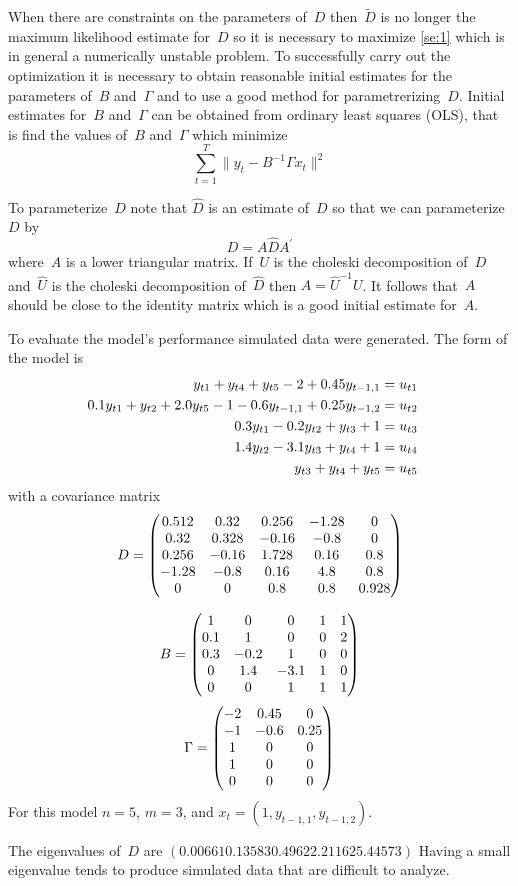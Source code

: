 When there are constraints on the parameters of~$D$ then~$\tilde D$ is
no longer the maximum likelihood estimate for~$D$ so
 it is necessary to 
maximize \ref{se:1} which is in general a numerically unstable problem. 
To successfully carry out the optimization it is necessary to obtain
reasonable initial estimates for the parameters of~$B$ and~$\Gamma$
and to use a good method for parametrerizing~$D$.
Initial estimates for~$B$ and~$\Gamma$ can be obtained from ordinary
least squares (OLS), that is find the values 
of~$B$ and~$\Gamma$ which minimize
$$\sum_{t=1}^T \|y_t - B^{-1}\Gamma x_t\|^2$$

To parameterize~$D$ note that $\hat D$ is an estimate of~$D$
so that we can parameterize~$D$ by
$$ D = A \hat D A^\prime$$
where~$A$ is a lower triangular matrix. If~$U$ is the choleski
decomposition of~$D$ and~$\hat U$ is the choleski decomposition
of~$\hat D$ then $A=\hat U^{-1}U$.
It follows that~$A$ should be close to the identity matrix which
is a good initial estimate for~$A$. 



To evaluate the model's performance simulated data were generated.
The form of the model is
 \begin{eqnarray}
   y_{t1}+y_{t4}+y_{t5}-2+0.45y_{t-1,1}&=u_{t1}\cr
   0.1y_{t1}+y_{t2}+2.0y_{t5}-1-0.6y_{t-1,1}+0.25y_{t-1,2}&=u_{t2}\cr
   0.3y_{t1}-0.2y_{t2}+y_{t3}+1&=u_{t3}\cr
   1.4y_{t2}-3.1y_{t3}+y_{t4}+1&=u_{t4}\cr
   y_{t3}+y_{t4}+y_{t5}&=u_{t5}\cr
 \end{eqnarray}
with a covariance matrix
$$D=\left(\begin{matrix}
0.512&0.32&0.256&-1.28&0\cr
0.32&0.328&-0.16&-0.8&0\cr
0.256&-0.16&1.728&0.16&0.8\cr
-1.28&-0.8&0.16&4.8&0.8\cr
0&0&0.8&0.8&0.928
\end{matrix}
       \right)
$$

$$B=\left(\begin{matrix} 
    1&0&0&1&1\cr
    0.1&1&0&0&2\cr
      0.3&-0.2&1&0&0\cr
      0&1.4&-3.1&1&0\cr
      0&0&1&1&1
  \end{matrix}
  \right)
$$
$$\Gamma=\left(\begin{matrix}-2&0.45&0\cr
         -1&-0.6&0.25\cr
          1&0&0\cr
          1&0&0\cr
          0&0&0
   \end{matrix}\right)
$$
For this model $n=5$, $m=3$, and $x_t=(1,y_{t-1,1},y_{t-1,2})$.

The eigenvalues of~$D$ are $(0.00661 0.13583 0.4962 2.21162 5.44573)$
Having a small eigenvalue tends to produce simulated data that are
difficult to analyze.

